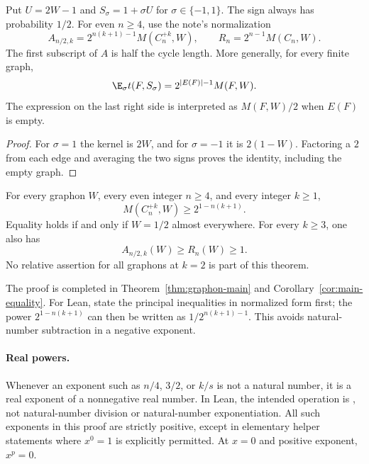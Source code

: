 \begin{definition}
\label{def:normalization}
Put $U=2W-1$ and $S_\sigma=1+\sigma U$ for $\sigma\in\{-1,1\}$.  The sign always has
probability $1/2$.  For even $n\ge4$, use the note's normalization
\[
 A_{n/2,k}=2^{n(k+1)-1}M(C_n^{+k},W),\qquad R_n=2^{n-1}M(C_n,W).
\]
The first subscript of $A$ is half the cycle length.  More generally, for every finite graph,
\[
 \E_\sigma t(F,S_\sigma)=2^{|E(F)|-1}M(F,W).
\]
The expression on the last right side is interpreted as $M(F,W)/2$ when $E(F)$ is empty.
\end{definition}

\begin{proof}
For $\sigma=1$ the kernel is $2W$, and for $\sigma=-1$ it is $2(1-W)$.  Factoring a $2$
from each edge and averaging the two signs proves the identity, including the empty graph.
\end{proof}

\begin{theorem}
\label{thm:main}
\proved For every graphon $W$, every even integer $n\ge4$, and every integer $k\ge1$,
\[
 M(C_n^{+k},W)\ge 2^{1-n(k+1)}.
\]
Equality holds if and only if $W=1/2$ almost everywhere.  For every $k\ge3$, one also has
\[
 A_{n/2,k}(W)\ge R_n(W)\ge1.
\]
No relative assertion for all graphons at $k=2$ is part of this theorem.
\end{theorem}

The proof is completed in Theorem~\ref{thm:graphon-main} and
Corollary~\ref{cor:main-equality}.  For Lean, state the principal inequalities in normalized
form first; the power $2^{1-n(k+1)}$ can then be written as
$1/2^{n(k+1)-1}$.  This avoids natural-number subtraction in a negative exponent.

\paragraph{Real powers.}
Whenever an exponent such as $n/4$, $3/2$, or $k/s$ is not a natural number, it is a real
exponent of a nonnegative real number.  In Lean, the intended operation is ,
not natural-number division or natural-number exponentiation.  All such exponents in this
proof are strictly positive, except in elementary helper statements where $x^0=1$ is
explicitly permitted.  At $x=0$ and positive exponent, $x^p=0$.

